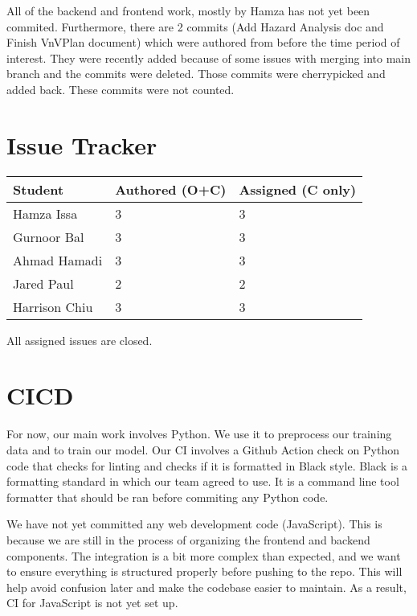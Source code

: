 \documentclass{article}
\begin{document}
All of the backend and frontend work, mostly by Hamza has not yet been commited. Furthermore, there are 2 commits (Add Hazard Analysis doc and Finish VnVPlan document) which were authored from before the time period of interest. They were recently added because of some issues with merging into main branch and the commits were deleted. Those commits were cherrypicked and added back. These commits were not counted.

\section{Issue Tracker}


\begin{table}[H]
\centering
\begin{tabular}{lll}
\toprule
\textbf{Student} & \textbf{Authored (O+C)} & \textbf{Assigned (C only)}\\
\midrule
Hamza Issa & 3 & 3\\
Gurnoor Bal & 3 & 3\\
Ahmad Hamadi & 3 & 3\\
Jared Paul & 2 & 2\\
Harrison Chiu & 3 & 3\\
\bottomrule
\end{tabular}
\end{table}

All assigned issues are closed.

\section{CICD}

For now, our main work involves Python. We use it to preprocess our training data and to train our model. Our CI involves a Github Action check on Python code that checks for linting and checks if it is formatted in Black style. Black is a formatting standard in which our team agreed to use. It is a command line tool formatter that should be ran before commiting any Python code. 

We have not yet committed any web development code (JavaScript). This is because we are still in the process of organizing the frontend and backend components. The integration is a bit more complex than expected, and we want to ensure everything is structured properly before pushing to the repo. This will help avoid confusion later and make the codebase easier to maintain. As a result, CI for JavaScript is not yet set up.
\end{document}
